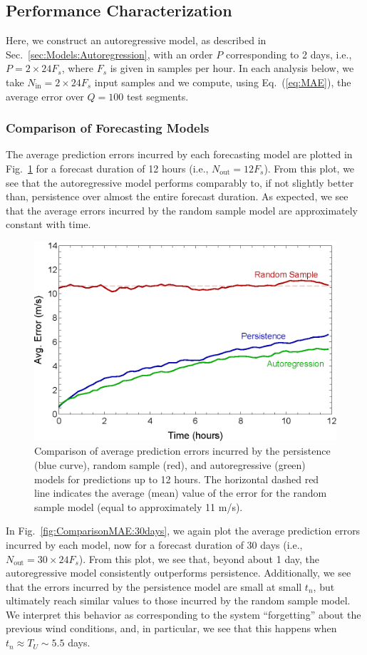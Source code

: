 \documentclass[11pt, oneside]{article}
\newcommand{\figref}[1]{Fig.~\ref{#1}}
\newcommand{\eqnref}[1]{Eq.~(\ref{#1})}
\newcommand{\secref}[1]{Sec.~\ref{#1}}
\begin{document}
\subsection{Performance Characterization}
Here, we construct an autoregressive model, as described in \secref{sec:Models:Autoregression}, with an order $P$ corresponding to 2 days, i.e., $P = 2 \times 24 F_s$, where $F_s$ is given in samples per hour.
In each analysis below, we take $N_\text{in} = 2 \times 24 F_s$ input samples and we compute, using \eqnref{eq:MAE}, the average error over $Q = 100$ test segments.

\subsubsection{Comparison of Forecasting Models}\label{sec:Results:Comparison}
The average prediction errors incurred by each forecasting model are plotted in \figref{fig:ComparisonMAE:12hrs} for a forecast duration of 12 hours (i.e., $N_\text{out} = 12 F_s$).
From this plot, we see that the autoregressive model performs comparably to, if not slightly better than, persistence over almost the entire forecast duration.
As expected, we see that the average errors incurred by the random sample model are approximately constant with time.

\begin{figure}[htb]
\centering
\includegraphics[width=0.7\columnwidth]{figures/ComparisonAvgPredictionError_12hrs}
\caption{Comparison of average prediction errors incurred by the persistence (blue curve), random sample (red), and autoregressive (green) models for predictions up to 12 hours.
The horizontal dashed red line indicates the average (mean) value of the error for the random sample model (equal to approximately 11 m/s).}
\label{fig:ComparisonMAE:12hrs}
\end{figure}

In \figref{fig:ComparisonMAE:30days}, we again plot the average prediction errors incurred by each model, now for a forecast duration of 30 days (i.e., $N_\text{out} = 30 \times 24 F_s$).
From this plot, we see that, beyond about 1 day, the autoregressive model consistently outperforms persistence.
Additionally, we see that the errors incurred by the persistence model are small at small $t_n$, but ultimately reach similar values to those incurred by the random sample model.
We interpret this behavior as corresponding to the system ``forgetting'' about the previous wind conditions, and, in particular, we see that this happens when $t_n \approx T_U \sim 5.5$ days.
\end{document}
